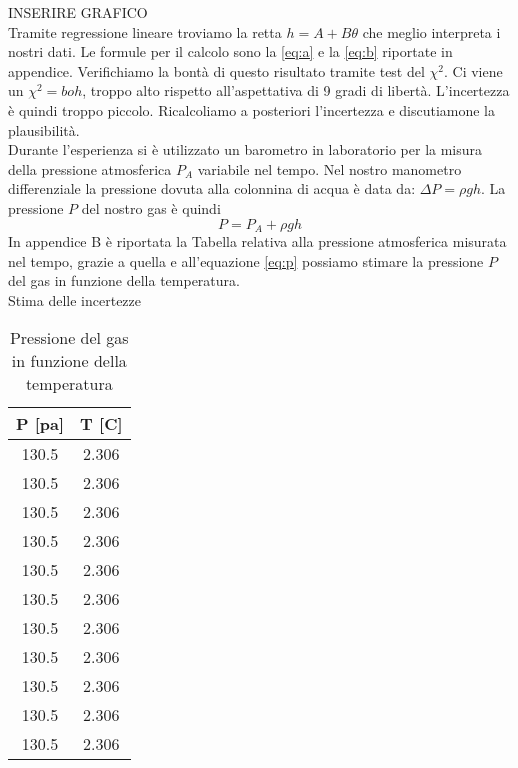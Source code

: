 INSERIRE GRAFICO\\
\newline
Tramite regressione lineare troviamo la retta $h = A+B\theta$ che meglio interpreta i nostri dati. Le formule per il calcolo sono la \eqref{eq:a} e la \eqref{eq:b} riportate in appendice.
Verifichiamo la bontà di questo risultato tramite test del $\chi^2$. Ci viene un $\chi^2=boh$, troppo alto rispetto all'aspettativa di 9 gradi di libertà. L'incertezza è quindi troppo piccolo. Ricalcoliamo a posteriori l'incertezza e discutiamone la plausibilità.\\
\newline
Durante l'esperienza si è utilizzato un barometro in laboratorio per la misura della pressione atmosferica $P_A$ variabile nel tempo. Nel nostro manometro differenziale la pressione dovuta alla colonnina di acqua è data da: $\Delta P = \rho gh$. La pressione $P$ del nostro gas è quindi 
\begin{equation}
\label{eq:p}
P = P_A + \rho gh
\end{equation}
In appendice B è riportata la Tabella relativa alla pressione atmosferica misurata nel tempo, grazie a quella e all'equazione \eqref{eq:p} possiamo stimare la pressione $P$ del gas in funzione della temperatura.\\
Stima delle incertezze\\
\begin{table}[H]
	\centering
	\begin{tabular}{|c|c|} \hline
		\textbf{P {[pa]} } & \textbf{T {[\degree C]} }  \\ \hline
		130.5 & 2.306  \\ \hline
		130.5 & 2.306  \\ \hline
		130.5 & 2.306  \\ \hline
		130.5 & 2.306  \\ \hline
		130.5 & 2.306  \\ \hline
		130.5 & 2.306  \\ \hline
		130.5 & 2.306  \\ \hline
		130.5 & 2.306  \\ \hline
		130.5 & 2.306  \\ \hline
		130.5 & 2.306  \\ \hline
		130.5 & 2.306  \\ \hline
	\end{tabular}
	\caption{Pressione del gas in funzione della temperatura}
\end{table}
